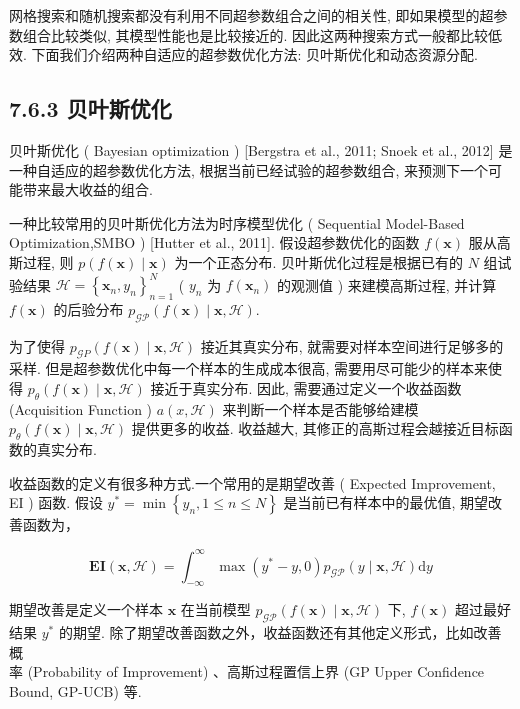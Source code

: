 \documentclass[10pt]{article}
\begin{document}
网格搜索和随机搜索都没有利用不同超参数组合之间的相关性, 即如果模型的超参数组合比较类似, 其模型性能也是比较接近的. 因此这两种搜索方式一般都比较低效. 下面我们介绍两种自适应的超参数优化方法: 贝叶斯优化和动态资源分配.

\subsection*{7.6.3 贝叶斯优化}
贝叶斯优化 ( Bayesian optimization ) [Bergstra et al., 2011; Snoek et al., 2012] 是一种自适应的超参数优化方法, 根据当前已经试验的超参数组合, 来预测下一个可能带来最大收益的组合.

一种比较常用的贝叶斯优化方法为时序模型优化 ( Sequential Model-Based Optimization,SMBO ) [Hutter et al., 2011]. 假设超参数优化的函数 $f(\boldsymbol{x})$ 服从高斯过程, 则 $p(f(\boldsymbol{x}) \mid \boldsymbol{x})$ 为一个正态分布. 贝叶斯优化过程是根据已有的 $N$ 组试验结果 $\mathcal{H}=\left\{\boldsymbol{x}_{n}, y_{n}\right\}_{n=1}^{N}$ ( $y_{n}$ 为 $f\left(\boldsymbol{x}_{n}\right)$ 的观测值 ) 来建模高斯过程, 并计算 $f(\boldsymbol{x})$ 的后验分布 $p_{\mathcal{G P}}(f(\boldsymbol{x}) \mid \boldsymbol{x}, \mathcal{H})$.

为了使得 $p_{\mathcal{G} P}(f(\boldsymbol{x}) \mid \boldsymbol{x}, \mathcal{H})$ 接近其真实分布, 就需要对样本空间进行足够多的采样. 但是超参数优化中每一个样本的生成成本很高, 需要用尽可能少的样本来使得 $p_{\theta}(f(\boldsymbol{x}) \mid \boldsymbol{x}, \mathcal{H})$ 接近于真实分布. 因此, 需要通过定义一个收益函数 (Acquisition Function ) $a(x, \mathcal{H})$ 来判断一个样本是否能够给建模 $p_{\theta}(f(\boldsymbol{x}) \mid \boldsymbol{x}, \mathcal{H})$ 提供更多的收益. 收益越大, 其修正的高斯过程会越接近目标函数的真实分布.

收益函数的定义有很多种方式.一个常用的是期望改善 ( Expected Improvement, EI ) 函数. 假设 $y^{*}=\min \left\{y_{n}, 1 \leq n \leq N\right\}$ 是当前已有样本中的最优值, 期望改善函数为，


\begin{equation*}
\mathbf{E I}(\boldsymbol{x}, \mathcal{H})=\int_{-\infty}^{\infty} \max \left(y^{*}-y, 0\right) p_{\mathcal{G P}}(y \mid \boldsymbol{x}, \mathcal{H}) \mathrm{d} y \tag{7.67}
\end{equation*}


期望改善是定义一个样本 $\boldsymbol{x}$ 在当前模型 $p_{\mathcal{G P}}(f(\boldsymbol{x}) \mid \boldsymbol{x}, \mathcal{H})$ 下, $f(\boldsymbol{x})$ 超过最好结果 $y^{*}$ 的期望. 除了期望改善函数之外，收益函数还有其他定义形式，比如改善概\\
率 (Probability of Improvement) 、高斯过程置信上界 (GP Upper Confidence Bound, GP-UCB) 等.
\end{document}
